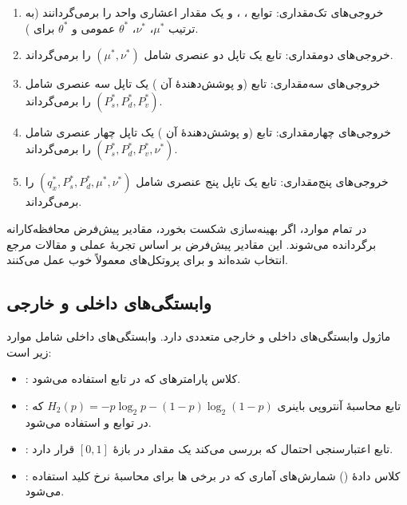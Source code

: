 \begin{enumerate}
	\item خروجی‌های تک‌مقداری: توابع ، ،  و  یک مقدار اعشاری واحد را برمی‌گردانند (به ترتیب $\mu^*$، $\nu^*$، $\theta^*$ عمومی و $\theta^*$ برای ).
	\item خروجی‌های دومقداری: تابع  یک تاپل دو عنصری شامل $(\mu^*, \nu^*)$ را برمی‌گرداند.
	\item خروجی‌های سه‌مقداری: تابع  (و پوشش‌دهندۀ آن ) یک تاپل سه عنصری شامل $(P_s^*, P_d^*, P_v^*)$ را برمی‌گرداند.
	\item خروجی‌های چهارمقداری: تابع  (و پوشش‌دهندۀ آن ) یک تاپل چهار عنصری شامل $(P_s^*, P_d^*, P_v^*, \nu^*)$ را برمی‌گرداند.
	\item خروجی‌های پنج‌مقداری: تابع  یک تاپل پنج عنصری شامل $(q_x^*, P_s^*, P_d^*, \mu^*, \nu^*)$ را برمی‌گرداند.
\end{enumerate}

در تمام موارد، اگر بهینه‌سازی شکست بخورد، مقادیر پیش‌فرض محافظه‌کارانه برگردانده می‌شوند. این مقادیر پیش‌فرض بر اساس تجربۀ عملی و مقالات مرجع انتخاب شده‌اند و برای پروتکل‌های  معمولاً خوب عمل می‌کنند.

\subsection{وابستگی‌های داخلی و خارجی}

ماژول وابستگی‌های داخلی و خارجی متعددی دارد. وابستگی‌های داخلی شامل موارد زیر است:

\begin{itemize}
	\item {}: کلاس پارامترهای  که در تابع  استفاده می‌شود.
	\item {}: تابع محاسبۀ آنتروپی باینری $H_2(p) = -p \log_2 p - (1-p) \log_2 (1-p)$ که در توابع  و  استفاده می‌شود.
	\item {}: تابع اعتبارسنجی احتمال که بررسی می‌کند یک مقدار در بازۀ $[0, 1]$ قرار دارد.
	\item {}: کلاس دادهٔ () شمارش‌های آماری که در برخی ‌ها برای محاسبۀ نرخ کلید استفاده می‌شود.
\end{itemize}

